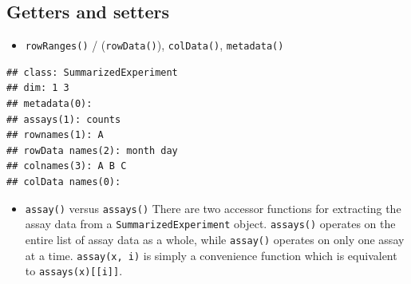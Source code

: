 \documentclass[]{article}
\newenvironment{Shaded}{\begin{snugshade}}{\end{snugshade}}
\newcommand{\CommentTok}[1]{\textcolor[rgb]{0.56,0.35,0.01}{\textit{#1}}}
\newcommand{\DataTypeTok}[1]{\textcolor[rgb]{0.13,0.29,0.53}{#1}}
\newcommand{\DecValTok}[1]{\textcolor[rgb]{0.00,0.00,0.81}{#1}}
\newcommand{\KeywordTok}[1]{\textcolor[rgb]{0.13,0.29,0.53}{\textbf{#1}}}
\newcommand{\NormalTok}[1]{#1}
\newcommand{\OperatorTok}[1]{\textcolor[rgb]{0.81,0.36,0.00}{\textbf{#1}}}
\newcommand{\StringTok}[1]{\textcolor[rgb]{0.31,0.60,0.02}{#1}}
\providecommand{\tightlist}{%
  \setlength{\itemsep}{0pt}\setlength{\parskip}{0pt}}
\begin{document}
\hypertarget{getters-and-setters}{%
\subsection{Getters and setters}\label{getters-and-setters}}

\begin{itemize}
\tightlist
\item
  \texttt{rowRanges()} / (\texttt{rowData()}), \texttt{colData()},
  \texttt{metadata()}
\end{itemize}

\begin{Shaded}
\end{Shaded}

\begin{verbatim}
## class: SummarizedExperiment 
## dim: 1 3 
## metadata(0):
## assays(1): counts
## rownames(1): A
## rowData names(2): month day
## colnames(3): A B C
## colData names(0):
\end{verbatim}

\begin{itemize}
\tightlist
\item
  \texttt{assay()} versus \texttt{assays()} There are two accessor
  functions for extracting the assay data from a
  \texttt{SummarizedExperiment} object. \texttt{assays()} operates on
  the entire list of assay data as a whole, while \texttt{assay()}
  operates on only one assay at a time. \texttt{assay(x,\ i)} is simply
  a convenience function which is equivalent to
  \texttt{assays(x){[}{[}i{]}{]}}.
\end{itemize}
\end{document}
